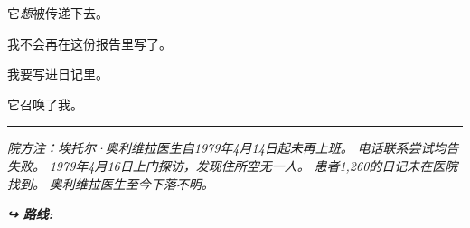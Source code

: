 \noindent 它\textit{想}被传递下去。

\noindent 我不会再在这份报告里写了。

\noindent 我要写进日记里。

\noindent 它召唤了我。

\vspace{0.5em}\noindent\rule{\textwidth}{0.5pt}\vspace{0.5em}

\noindent \textit{院方注：埃托尔·奥利维拉医生自1979年4月14日起未再上班。}
\textit{电话联系尝试均告失败。}
\textit{1979年4月16日上门探访，发现住所空无一人。}
\textit{患者1,260的日记未在医院找到。}
\textit{奥利维拉医生至今下落不明。}

\vspace{0.5em}
\noindent\textit{\textbf{↪ 路线:}  \rotasep {}}
